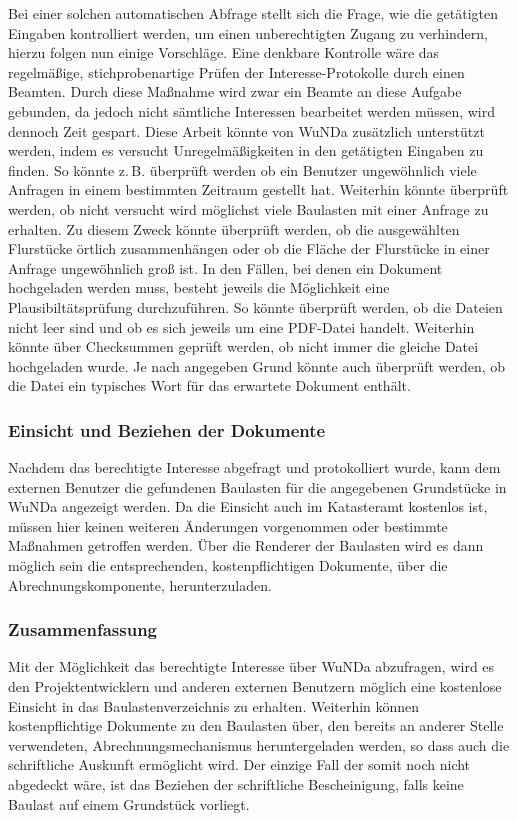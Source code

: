 Bei einer solchen automatischen Abfrage stellt sich die Frage, wie die getätigten Eingaben kontrolliert werden, um einen unberechtigten Zugang zu verhindern, hierzu folgen nun einige Vorschläge.
Eine denkbare Kontrolle wäre das regelmäßige, stichprobenartige Prüfen der Interesse-Protokolle durch einen Beamten.
Durch diese Maßnahme wird zwar ein Beamte an diese Aufgabe gebunden, da jedoch nicht sämtliche Interessen bearbeitet werden müssen, wird dennoch Zeit gespart.
Diese Arbeit könnte von \ac{WuNDa} zusätzlich unterstützt werden, indem es versucht Unregelmäßigkeiten in den getätigten Eingaben zu finden.
So könnte z.\,B. überprüft werden ob ein Benutzer ungewöhnlich viele Anfragen in einem bestimmten Zeitraum gestellt hat.
Weiterhin könnte überprüft werden, ob nicht versucht wird möglichst viele Baulasten mit einer Anfrage zu erhalten.
Zu diesem Zweck könnte überprüft werden, ob die ausgewählten Flurstücke örtlich zusammenhängen oder ob die Fläche der Flurstücke in einer Anfrage ungewöhnlich groß ist.
In den Fällen, bei denen ein Dokument hochgeladen werden muss, besteht jeweils die Möglichkeit eine Plausibiltätsprüfung durchzuführen.
So könnte überprüft werden, ob die Dateien nicht leer sind und ob es sich jeweils um eine PDF-Datei handelt.
Weiterhin könnte über Checksummen geprüft werden, ob nicht immer die gleiche Datei hochgeladen wurde.
Je nach angegeben Grund könnte auch überprüft werden, ob die Datei ein typisches Wort für das erwartete Dokument enthält.

\subsubsection{Einsicht und Beziehen der Dokumente}
Nachdem das berechtigte Interesse abgefragt und protokolliert wurde, kann dem externen Benutzer die gefundenen Baulasten für die angegebenen Grundstücke in \ac{WuNDa} angezeigt werden.
Da die Einsicht auch im Katasteramt kostenlos ist, müssen hier keinen weiteren Änderungen vorgenommen oder bestimmte Maßnahmen getroffen werden.
Über die Renderer der Baulasten wird es dann möglich sein die entsprechenden, kostenpflichtigen Dokumente, über die Abrechnungskomponente, herunterzuladen.

\subsubsection{Zusammenfassung}
Mit der Möglichkeit das berechtigte Interesse über \ac{WuNDa} abzufragen, wird es den Projektentwicklern und anderen externen Benutzern möglich eine kostenlose Einsicht in das Baulastenverzeichnis zu erhalten.
Weiterhin können kostenpflichtige Dokumente zu den Baulasten über, den bereits an anderer Stelle verwendeten, Abrechnungsmechanismus heruntergeladen werden, so dass auch die schriftliche Auskunft ermöglicht wird.
Der einzige Fall der somit noch nicht abgedeckt wäre, ist das Beziehen der schriftliche Bescheinigung, falls keine Baulast auf einem Grundstück vorliegt.

